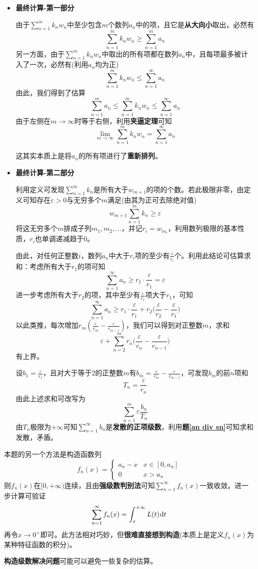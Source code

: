 \documentclass[a4paper,UTF8,fontset=windows,AutoFakeBold]{ctexart}
\newcommand*{\dr}{\hspace{0.07em}\mathrm{d}}
\newcommand*{\suminf}[1][n=1]{\sum_{#1}^\infty}
\newcommand*{\note}{\noindent *}
\theoremstyle{ex}
\newcommand{\exref}[1]{\textbf{题\;\ref{#1}\;}}
\begin{document}
\begin{framed}
{\begin{itemize}
        \item \textbf{最终计算-第一部分}
        
        由于$\sum_{n=1}^mk_nw_n$中至少包含$m$个数列$a_n$中的项，且它是\textbf{从大向小}取出，必然有
        $$\sum_{n=1}^mk_nw_n\ge\sum_{n=1}^ma_n$$
        另一方面，由于$\sum_{n=1}^mk_nw_n$中取出的所有项都在数列$a_n$中，且每项最多被计入了一次，必然有(利用$a_n$均为正)
        $$\sum_{n=1}^mk_nw_n\le\suminf a_n$$
        由此，我们得到了估算
        $$\sum_{n=1}^ma_n\le\sum_{n=1}^mk_nw_n\le\suminf a_n$$
        由于左侧在$m\to\infty$时等于右侧，利用\textbf{夹逼定理}可知
        $$\lim_{m\to\infty}\sum_{n=1}^mk_nw_n=\suminf a_n$$

        \note 这其实本质上是将$a_n$的所有项进行了\textbf{重新排列}。

        \item \textbf{最终计算-第二部分}
        
        利用定义可发现$\sum_{n=1}^mk_n$是所有大于$w_{m+1}$的项的个数。若此极限非零，由定义可知存在$\varepsilon>0$与无穷多个$m$满足(由其为正可去除绝对值)
        $$w_{m+1}\sum_{n=1}^mk_n\ge\varepsilon$$
        将这无穷多个$m$排成子列$m_1,m_2,\dots$，并记$r_i=w_{m_i}$，利用数列极限的基本性质，$r_i$也单调递减趋于0。

        由此，对任何正整数$i$，数列$a_n$中大于$r_i$项的至少有$\frac{\varepsilon}{r_i}$个。利用此结论可估算求和：考虑所有大于$r_1$的项可知
        $$\suminf a_n\ge r_1\cdot\frac{\varepsilon}{r_1}=\varepsilon$$
        进一步考虑所有大于$r_2$的项，其中至少有$\frac{\varepsilon}{r_1}$项大于$r_1$，可知
        $$\suminf a_n\ge r_1\cdot\frac{\varepsilon}{r_1}+r_2\bigg(\frac{\varepsilon}{r_2}-\frac{\varepsilon}{r_1}\bigg)$$
        以此类推，每次增加$r_m(\frac{\varepsilon}{r_m}-\frac{\varepsilon}{r_{m-1}})$，我们可以得到对正整数$m$，求和
        $$\varepsilon+\sum_{n=2}^mr_n\bigg(\frac{\varepsilon}{r_n}-\frac{\varepsilon}{r_{n-1}}\bigg)$$
        有上界。

        设$b_1=\frac{\varepsilon}{r_1}$，且对大于等于2的正整数$m$有$b_m=\frac{\varepsilon}{r_m}-\frac{\varepsilon}{r_{m-1}}$，可发现$b_m$的前$n$项和
        $$T_n=\frac{\varepsilon}{r_n}$$
        由此上述求和可改写为
        $$\sum_{n=1}^m\varepsilon\frac{b_n}{T_n}$$
        由$T_n$极限为$+\infty$可知$\suminf b_n$是\textbf{发散的正项级数}，利用\exref{an div sn}可知求和发散，矛盾。
    \end{itemize}

    \note 本题的另一个方法是构造函数列
    $$f_n(x)=\begin{cases}a_n-x&x\in[0,a_n]\\0&x>a_n\end{cases}$$
    则$f_n(x)$在$[0,+\infty)$连续，且由\textbf{强级数判别法}可知$\suminf f_n(x)$一致收敛。进一步计算可验证
    $$\suminf f_n(x)=\int_x^{+\infty}L(t)\dr t$$
    再令$x\to0^+$即可。此方法相对巧妙，但\textbf{很难直接想到构造}(本质上是定义$f_n(x)$为某种特征函数的积分)。

}
\end{framed}

\note \textbf{构造级数解决问题}可能可以避免一些复杂的估算。
\end{document}
